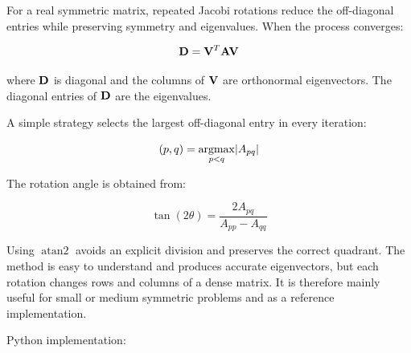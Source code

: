 For a real symmetric matrix, repeated Jacobi rotations reduce the off-diagonal
entries while preserving symmetry and eigenvalues. When the process converges:

\begin{equation}
    \mathbf{D}=\mathbf{V}^{T}\mathbf{A}\mathbf{V}
\end{equation}

where $ \mathbf{D} $ is diagonal and the columns of $ \mathbf{V} $ are orthonormal
eigenvectors. The diagonal entries of $ \mathbf{D} $ are the eigenvalues.

A simple strategy selects the largest off-diagonal entry in every iteration:

\begin{equation}
    (p,q)=\underset{p<q}{\operatorname{argmax}}| {A_{pq}} |
\end{equation}

The rotation angle is obtained from:

\begin{equation}
    \tan(2\theta)=\frac{2A_{pq}}{A_{pp}-A_{qq}}
\end{equation}

Using $ \operatorname{atan2} $ avoids an explicit division and preserves the
correct quadrant. The method is easy to understand and produces accurate
eigenvectors, but each rotation changes rows and columns of a dense matrix. It
is therefore mainly useful for small or medium symmetric problems and as a
reference implementation.

Python implementation:


